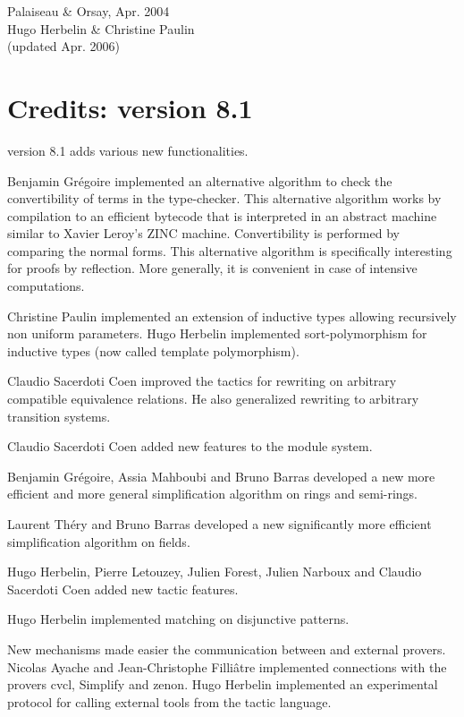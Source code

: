\begin{flushright}
Palaiseau \& Orsay, Apr. 2004\\
Hugo Herbelin \& Christine Paulin\\
(updated Apr. 2006)
\end{flushright}

\section*{Credits: version 8.1}

{\Coq} version 8.1 adds various new functionalities.

Benjamin Grégoire implemented an alternative algorithm to check the
convertibility of terms in the {\Coq} type-checker. This alternative
algorithm works by compilation to an efficient bytecode that is
interpreted in an abstract machine similar to Xavier Leroy's ZINC
machine.  Convertibility is performed by comparing the normal
forms. This alternative algorithm is specifically interesting for
proofs by reflection. More generally, it is convenient in case of
intensive computations.

Christine Paulin implemented an extension of inductive types allowing
recursively non uniform parameters. Hugo Herbelin implemented
sort-polymorphism for inductive types (now called template polymorphism).

Claudio Sacerdoti Coen improved the tactics for rewriting on arbitrary
compatible equivalence relations. He also generalized rewriting to
arbitrary transition systems.

Claudio Sacerdoti Coen added new features to the module system. 

Benjamin Grégoire, Assia Mahboubi and Bruno Barras developed a new
more efficient and more general simplification algorithm on rings and
semi-rings.

Laurent Théry and Bruno Barras developed a new significantly more efficient
simplification algorithm on fields.

Hugo Herbelin, Pierre Letouzey, Julien Forest, Julien Narboux and
Claudio Sacerdoti Coen added new tactic features.

Hugo Herbelin implemented matching on disjunctive patterns.

New mechanisms made easier the communication between {\Coq} and external
provers. Nicolas Ayache and Jean-Christophe Filliâtre implemented
connections with the provers {\sc cvcl}, {\sc Simplify} and {\sc
zenon}. Hugo Herbelin implemented an experimental protocol for calling
external tools from the tactic language.

